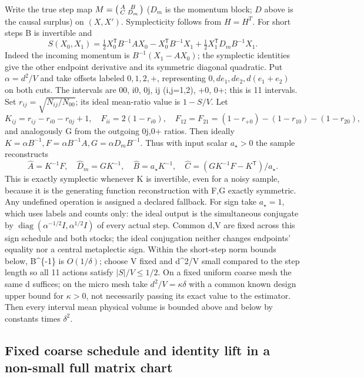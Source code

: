 \documentclass[11pt]{article}
\begin{document}
Write the true step map \(M=\begin{psmallmatrix}A&B\\ C&D_m\end{psmallmatrix}\) (\(D_m\) is the momentum block; \(D\) above is the causal surplus) on \((X,X')\). Symplecticity follows from \(H=H^T\). For short steps B is invertible and
\[
 S(X_0,X_1)=\tfrac12 X_0^{\mathsf T}B^{-1}AX_0-X_0^{\mathsf T}B^{-1}X_1+
 \tfrac12 X_1^{\mathsf T}D_m B^{-1}X_1 .
\]
Indeed the incoming momentum is \(B^{-1}(X_1-AX_0)\); the symplectic identities give the other endpoint derivative and its symmetric diagonal quadratic. Put \(\alpha=d^2/V\) and take offsets labeled \(0,1,2,+\), representing \(0,de_1,de_2,d(e_1+e_2)\) on both cuts. The intervals are 00, i0, 0j, ij (i,j=1,2), +0, 0+; this is 11 intervals. Set \(r_{ij}=\sqrt{N_{ij}/N_{00}}\); its ideal mean-ratio value is \(1-S/V\). Let
\[
 K_{ij}=r_{ij}-r_{i0}-r_{0j}+1,\quad
 F_{ii}=2(1-r_{i0}),\quad F_{12}=F_{21}=(1-r_{+0})-(1-r_{10})-(1-r_{20}),
\]
and analogously G from the outgoing 0j,0+ ratios. Then ideally
\(K=\alpha B^{-1}, F=\alpha B^{-1}A, G=\alpha D_mB^{-1}\).
Thus with input scalar \(a_\star>0\) the sample reconstructs
\[
 \widehat A=K^{-1}F,\quad \widehat D_m=GK^{-1},\quad
 \widehat B=a_\star K^{-1},\quad
 \widehat C=(GK^{-1}F-K^{\mathsf T})/a_\star .
\]
This is exactly symplectic whenever K is invertible, even for a noisy sample, because it is the generating function reconstruction with F,G exactly symmetric. Any undefined operation is assigned a declared fallback. For sign take \(a_\star=1\), which uses labels and counts only: the ideal output is the simultaneous conjugate by \(\operatorname{diag}(\alpha^{-1/2}I,\alpha^{1/2}I)\) of every actual step. Common d,V are fixed across this sign schedule and both stocks; the ideal conjugation neither changes endpoints' equality nor a central metaplectic sign. Within the short-step norm bounds below, B\^{}\{-1\} is \(O(1/\delta)\); choose V fixed and d\^{}2/V small compared to the step length so all 11 actions satisfy \(|S|/V\le 1/2\). On a fixed uniform coarse mesh the same d suffices; on the micro mesh take \(d^2/V=\kappa\delta\) with a common known design upper bound for \(\kappa>0\), not necessarily passing its exact value to the estimator. Then every interval mean physical volume is bounded above and below by constants times \(\delta^2\).

\subsection{Fixed coarse schedule and identity lift in a non-small full matrix chart}\label{fixed-coarse-schedule-and-identity-lift-in-a-non-small-full-matrix-chart}
\end{document}
